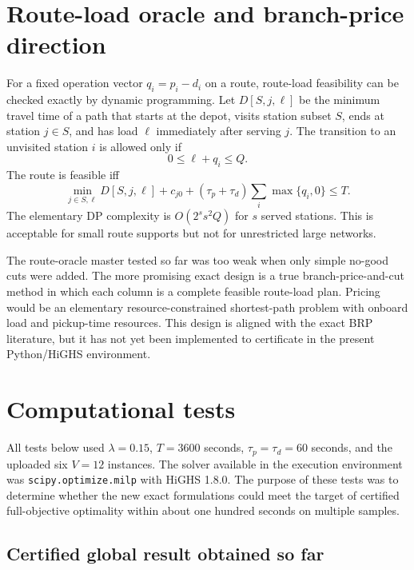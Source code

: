 \documentclass[11pt]{article}
\begin{document}
\section{Route-load oracle and branch-price direction}

For a fixed operation vector $q_i=p_i-d_i$ on a route, route-load feasibility can be checked exactly by dynamic programming.  Let $D[S,j,\ell]$ be the minimum travel time of a path that starts at the depot, visits station subset $S$, ends at station $j\in S$, and has load $\ell$ immediately after serving $j$.  The transition to an unvisited station $i$ is allowed only if
\begin{equation}
    0\le \ell+q_i\le Q.
\end{equation}
The route is feasible iff
\begin{equation}
    \min_{j\in S,\ell}D[S,j,\ell]+c_{j0}+ (\tau_p+\tau_d)\sum_i \max\{q_i,0\}\le T.
\end{equation}
The elementary DP complexity is $O(2^s s^2Q)$ for $s$ served stations.  This is acceptable for small route supports but not for unrestricted large networks.

The route-oracle master tested so far was too weak when only simple no-good cuts were added.  The more promising exact design is a true branch-price-and-cut method in which each column is a complete feasible route-load plan.  Pricing would be an elementary resource-constrained shortest-path problem with onboard load and pickup-time resources.  This design is aligned with the exact BRP literature, but it has not yet been implemented to certificate in the present Python/HiGHS environment.

\section{Computational tests}

All tests below used $\lambda=0.15$, $T=3600$ seconds, $\tau_p=\tau_d=60$ seconds, and the uploaded six $V=12$ instances.  The solver available in the execution environment was \texttt{scipy.optimize.milp} with HiGHS 1.8.0.  The purpose of these tests was to determine whether the new exact formulations could meet the target of certified full-objective optimality within about one hundred seconds on multiple samples.

\subsection{Certified global result obtained so far}
\end{document}

